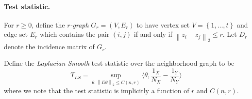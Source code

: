 \documentclass{article}
\newcommand{\norm}[1]{\left\lVert#1\right\rVert}
\newcommand{\set}[1]{\left\{#1\right\}}
\newcommand{\dotp}[2]{\langle #1, #2 \rangle}
\newcommand{\1}{\mathbb{I}}
\theoremstyle{alden}
\theoremstyle{aldenthm}
\theoremstyle{definition}
\theoremstyle{remark}
\begin{document}
\paragraph{Test statistic.}

For $r \geq 0$, define the \emph{$r$-graph} $G_r = (V,E_r)$ to have vertex set $V = \set{1,\ldots,t}$ and edge set $E_r$ which contains the pair $(i,j)$ if and only if $\norm{z_i - z_j}_2 \leq r$. Let $D_{r}$ denote the incidence matrix of $G_r$.

Define the \emph{Laplacian Smooth} test statistic over the neighborhood graph to be
\begin{equation*}
T_{LS} = \sup_{\theta: \norm{D\theta}_2 \leq C(n,r)} \dotp{\theta }{\frac{1_X}{N_X} - \frac{1_Y}{N_Y}}
\end{equation*}
where we note that the test statistic is implicitly a function of $r$ and $C(n,r)$. 
\end{document}

